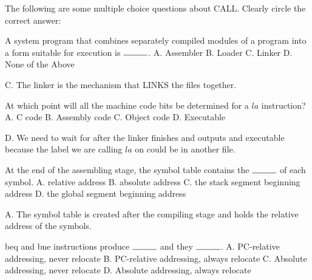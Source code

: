 \begin{blocksection}
\question The following are some multiple choice questions about CALL. Clearly circle the correct answer: 

\begin{parts}
\item 
A system program that combines separately compiled modules of a program into a form suitable for execution is $\rule{1cm}{0.15mm}$. \newline
A. Assembler \newline
B. Loader \newline
C. Linker \newline
D. None of the Above 

\begin{solution}
    C. The linker is the mechanism that LINKS the files together.
\end{solution}

\item
At which point will all the machine code bits be determined for a $la$ instruction? \newline
A. C code \newline
B. Assembly code \newline
C. Object code \newline
D. Executable 

\begin{solution}
    D. We need to wait for after the linker finishes and outputs and executable because the label we are calling $la$ on could be in another file.
\end{solution}

\item
At the end of the assembling stage, the symbol table contains the $\rule{1cm}{0.15mm}$ of each symbol. \newline
A. relative address \newline
B. absolute address \newline
C. the stack segment beginning address \newline
D. the global segment beginning address 

\begin{solution}
    A. The symbol table is created after the compiling stage and holds the relative address of the symbols.
\end{solution}

\item
beq and bne instructions produce $\rule{1cm}{0.15mm}$ and they $\rule{1cm}{0.15mm}$. \newline
A. PC-relative addressing, never relocate \newline
B. PC-relative addressing, always relocate \newline
C. Absolute addressing, never relocate \newline
D. Absolute addressing, always relocate 


\end{parts}
\end{blocksection}
